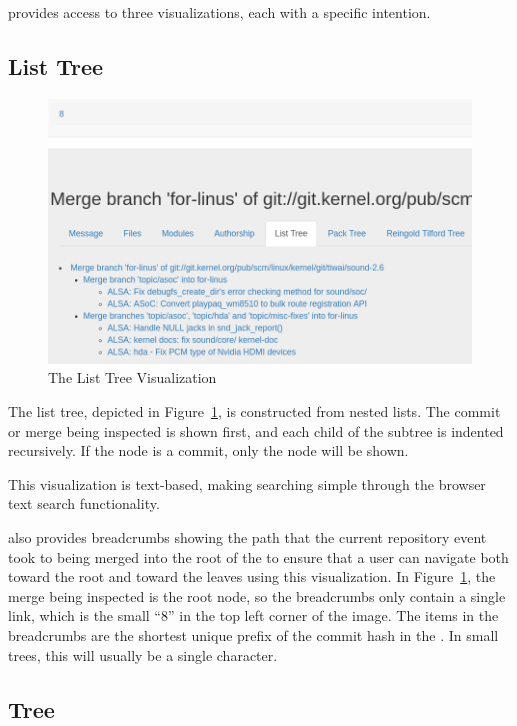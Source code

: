 \tool{} provides access to three visualizations, each with a specific
intention.

\subsection{List Tree}\label{sub:list_tree}

\begin{figure}[htpb]
  \centering
  \includegraphics[width=0.9\linewidth]{Figures/Linvis/linvis_list_tree.png}
  \caption{The List Tree Visualization}
  \label{fig:linvis_list_tree}
\end{figure}

The list tree, depicted in Figure~\ref{fig:linvis_list_tree}, is
constructed from nested lists.
The commit or merge being inspected is shown first, and each child of
the subtree is indented recursively.
If the node is a commit, only the node will be shown.

This visualization is text-based, making
searching simple through the browser text search functionality.

\tool{} also provides breadcrumbs showing the path that the current
repository event took to being merged into the root of the \mt{} to
ensure that a user can navigate both toward the root and toward the
leaves using this visualization.
In Figure~\ref{fig:linvis_list_tree}, the merge being inspected is the
root node, so the breadcrumbs only contain a single link, which is the
small ``8'' in the top left corner of the image.
The items in the breadcrumbs are the shortest unique prefix of the
commit hash in the \mt{}.
In small trees, this will usually be a single character.

\subsection{\rt{} Tree}
\label{sub:rt_tree}

